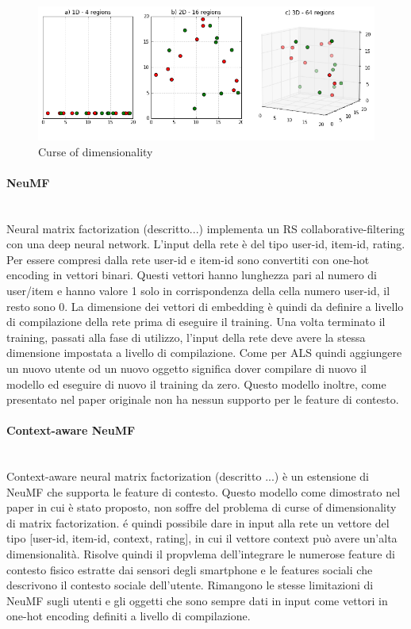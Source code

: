 \documentclass[12pt,italian]{report}
\newcommand{\myparagraph}[1]{\paragraph{#1}\mbox{}\\}
\begin{document}
\begin{figure}
  \includegraphics[width=\linewidth]{immagini/curse_of_dimensionality.png}
  \caption{Curse of dimensionality}
  \label{fig:curse-dim}
\end{figure}

\myparagraph{NeuMF}
Neural matrix factorization (descritto...) implementa un RS
collaborative-filtering con una deep neural network. L'input della 
rete è del tipo user-id, item-id, rating. Per essere compresi 
dalla rete user-id e item-id sono convertiti con one-hot encoding in 
vettori binari. Questi vettori hanno lunghezza pari al numero di 
user/item e hanno valore 1 solo in corrispondenza della cella numero 
user-id, il resto sono 0. La dimensione dei vettori di embedding è quindi da definire a livello di compilazione della rete prima di eseguire il training. Una volta terminato il training, passati alla fase di utilizzo, l'input della rete deve avere la stessa dimensione impostata a livello di compilazione. Come per ALS quindi aggiungere un nuovo utente od un nuovo oggetto significa dover compilare di nuovo il modello ed eseguire di nuovo il training da zero. Questo modello inoltre, come presentato nel paper originale \cite{NCF} non ha nessun supporto per le feature di contesto.

\myparagraph{Context-aware NeuMF}
Context-aware neural matrix factorization (descritto ...) è un estensione di NeuMF che supporta le feature di contesto. Questo modello come dimostrato nel paper in cui è stato proposto, non soffre del problema di curse of dimensionality di matrix factorization. é quindi possibile dare in input alla rete un vettore del tipo [user-id, item-id, context, rating], in cui il vettore context può avere un'alta dimensionalità. Risolve quindi il propvlema dell'integrare le numerose feature di contesto fisico estratte dai sensori degli smartphone e le features sociali che descrivono il contesto sociale dell'utente. Rimangono le stesse limitazioni di NeuMF sugli utenti e gli oggetti che sono sempre dati in input come vettori in one-hot encoding definiti a livello di compilazione.
\end{document}
